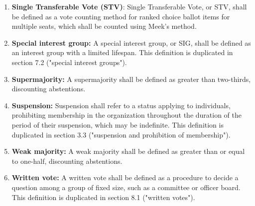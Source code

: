 \documentclass[11pt]{article}
\newcounter{h1}
\newcounter{h2}[h1]
\newcounter{h3}[h2]
\begin{document}
\begin{enumerate}
  \begin{enumerate}
    \item \textbf{Simple resolution:} A simple resolution or majority resolution shall be defined as a resolution which may be passed by acclamation, by a supermajority show-of-hands vote during a collective organization meeting, or by a majority formal vote ballot item.  
    \item \textbf{Supermajority resolution:} A supermajority resolution shall be defined as a resolution which may be passed only by a supermajority formal vote ballot item.  
  \end{enumerate}
  \item \textbf{Single Transferable Vote (STV)}: Single Transferable Vote, or STV, shall be defined as a vote counting method for ranked choice ballot items for multiple seats, which shall be counted using Meek's method.  
  \item \textbf{Special interest group:} A special interest group, or SIG, shall be defined as an interest group with a limited lifespan. This definition is duplicated in section 7.2 ("special interest groups").  
  \item \textbf{Supermajority:} A supermajority shall be defined as greater than two-thirds, discounting abstentions.  
  \item \textbf{Suspension:} Suspension shall refer to a status applying to individuals, prohibiting membership in the organization throughout the duration of the period of their suspension, which may be indefinite. This definition is duplicated in section 3.3 ("suspension and prohibition of membership").  
  \item \textbf{Weak majority:} A weak majority shall be defined as greater than or equal to one-half, discounting abstentions.  
  \item \textbf{Written vote:} A written vote shall be defined as a procedure to decide a question among a group of fixed size, such as a committee or officer board. This definition is duplicated in section 8.1 ("written votes").
\end{enumerate}


\end{document}
